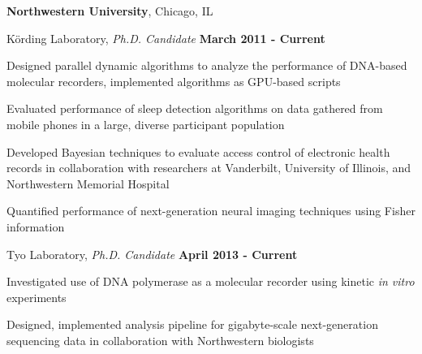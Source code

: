\documentclass[10pt]{article}
\begin{document}
\textbf{Northwestern University},
Chicago, IL
\begin{outerlist}
\item[] K\"ording Laboratory, \textit{Ph.D. Candidate}
\hfill \textbf{March 2011 - Current}
	\begin{innerlist}
	\item Designed parallel dynamic algorithms to analyze the performance of DNA-based molecular recorders, implemented algorithms as GPU-based scripts
	\item Evaluated performance of sleep detection algorithms on data gathered from mobile phones in a large, diverse participant population
	\item Developed Bayesian techniques to evaluate access control of electronic health records in collaboration with researchers at Vanderbilt, University of Illinois, and Northwestern Memorial Hospital
	\item Quantified performance of next-generation neural imaging techniques using Fisher information
	\end{innerlist}
		
\item[] Tyo Laboratory, \textit{Ph.D. Candidate}
\hfill \textbf{April 2013 - Current}
	\begin{innerlist}
	\item Investigated use of DNA polymerase as a molecular recorder using kinetic \textit{in vitro} experiments
	\item Designed, implemented analysis pipeline for gigabyte-scale next-generation sequencing data in collaboration with Northwestern biologists
	\end{innerlist}
	
%	
\end{outerlist}
\end{document}
